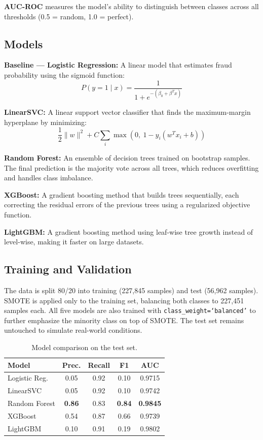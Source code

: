 \documentclass{article}
\begin{document}
\textbf{AUC-ROC} measures the model's ability to distinguish between
classes across all thresholds (0.5 = random, 1.0 = perfect).

\subsection{Models}

\textbf{Baseline --- Logistic Regression:} A linear model that estimates
fraud probability using the sigmoid function:
\[
  P(y=1 \mid x) = \frac{1}{1 + e^{-(\beta_0 + \beta^T x)}}
\]

\textbf{LinearSVC:} A linear support vector classifier that finds the
maximum-margin hyperplane by minimizing:
\[
  \frac{1}{2}\|w\|^2 + C \sum_{i}
  \max\!\left(0,\ 1 - y_i(w^T x_i + b)\right)
\]

\textbf{Random Forest:} An ensemble of decision trees trained on
bootstrap samples. The final prediction is the majority vote across all
trees, which reduces overfitting and handles class imbalance.

\textbf{XGBoost:} A gradient boosting method that builds trees
sequentially, each correcting the residual errors of the previous trees
using a regularized objective function.

\textbf{LightGBM:} A gradient boosting method using leaf-wise tree
growth instead of level-wise, making it faster on large datasets.

\subsection{Training and Validation}

The data is split 80/20 into training (227,845 samples) and test
(56,962 samples). SMOTE is applied only to the training set, balancing
both classes to 227,451 samples each. All five models are also trained
with \texttt{class\_weight=`balanced'} to further emphasize the minority
class on top of SMOTE. The test set remains untouched to simulate
real-world conditions.

\begin{table}[H]
\centering
\caption{Model comparison on the test set.}
\label{tab:results}
\vskip 0.1in
\begin{small}
\begin{tabular}{lcccc}
\toprule
Model & Prec. & Recall & F1 & AUC \\
\midrule
Logistic Reg.  & 0.05 & 0.92 & 0.10 & 0.9715 \\
LinearSVC      & 0.05 & 0.92 & 0.10 & 0.9742 \\
Random Forest  & \textbf{0.86} & 0.83 & \textbf{0.84} & \textbf{0.9845} \\
XGBoost        & 0.54 & 0.87 & 0.66 & 0.9739 \\
LightGBM       & 0.10 & 0.91 & 0.19 & 0.9802 \\
\bottomrule
\end{tabular}
\end{small}
\end{table}
\end{document}
